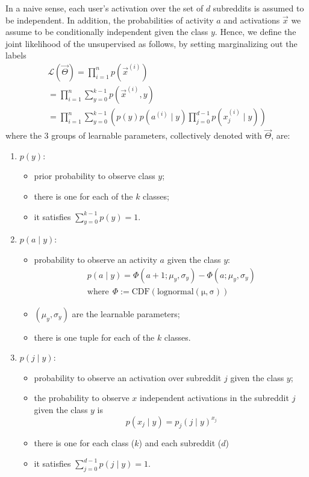 In a naive sense, each user's activation over the set of $d$ subreddits is assumed to be independent.
In addition, the probabilities of activity $a$ and activations $\Vec{x}$ we assume to be conditionally independent given the class $y$.
Hence, we define the joint likelihood of the unsupervised as follows, by setting marginalizing out the labels
\begin{align*}
     \mathcal{L}(\vec{\Theta}) = \prod_{i=1}^{n} p(\vec{x}^{(i)})\\
     =  \prod_{i=1}^{n}  \sum_{y=0}^{k-1} p(\vec{x}^{(i)}, y) \\
     =  \prod_{i=1}^{n}  \sum_{y=0}^{k-1}\left( p(y) p(a^{(i)} \mid y) \prod_{j=0}^{d-1} p(x_j^{(i)} \mid y)\right)
\end{align*}
where the 3 groups of learnable parameters, collectively denoted with $\vec{\Theta}$, are: 
\begin{enumerate}
    \item $p(y)$:
    \begin{itemize}
        \item prior probability to observe class $y$;
        \item there is one for each of the $k$ classes;
        \item it satisfies $\sum_{y=0}^{k-1} p(y)=1$.
    \end{itemize}
    \item $p(a \mid y)$:
    \begin{itemize}
        \item probability to observe an activity $a$ given the class $y$:
              \begin{align*}
                  p(a \mid y)=\Phi(a+1;\mu_y, \sigma_y)-\Phi(a;\mu_y, \sigma_y) \\
                  \mathrm{where} \: \: \Phi:= \mathrm{CDF(lognormal(\mu, \sigma))}
              \end{align*}
        \item $(\mu_y, \sigma_y)$ are the learnable parameters;
        \item there is one tuple for each of the $k$ classes.
    \end{itemize}
    \item $p(j \mid y)$: 
    \begin{itemize}
        \item probability to observe an activation over subreddit $j$ given the class $y$;
        \item the probability to observe $x$ independent activations in the subreddit $j$ given the class $y$ is \[
        p(x_j \mid y)=p_j(j \mid y)^{x_j}
        \] 
        \item there is one for each class ($k$) and each subreddit ($d$)
        \item it satisfies $\sum_{j=0}^{d-1} p(j \mid y)=1$.
    \end{itemize}
\end{enumerate}

